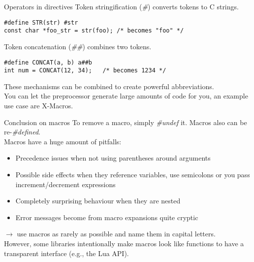 \begin{frame}[fragile = singleslide]{Operators in directives}
	Token stringification (\textit{\#}) converts tokens to C strings.
	\begin{lstlisting}[numbers=none]
#define STR(str) #str
const char *foo_str = str(foo);	/* becomes "foo" */
\end{lstlisting}
	\bigskip
	Token concatenation (\textit{\#\#}) combines two tokens.
\begin{lstlisting}[numbers=none]
#define CONCAT(a, b) a##b
int num = CONCAT(12, 34);	/* becomes 1234 */
\end{lstlisting}
	\bigskip
	These mechanisms can be combined to create powerful abbreviations.\\
	\bigskip
	You can let the preprocessor generate large amounts of code for you,
	an example use case are X-Macros.
\end{frame}

\begin{frame}[fragile = singleslide]{Conclusion on macros}
	To remove a macro, simply \textit{\#undef} it. Macros also can be re-\textit{\#defined}.\\
	\bigskip
	Macros have a huge amount of pitfalls:
	\begin{itemize}
		\item Precedence issues when not using parentheses around arguments
		\item Possible side effects when they reference variables, use semicolons
			  or you pass increment/decrement expressions
		\item Completely surprising behaviour when they are nested
		\item Error messages become from macro expansions quite cryptic
	\end{itemize}
	\bigskip
	$\rightarrow$ use macros as rarely as possible and name them in capital letters.\\
	\bigskip
	However, some libraries intentionally make macros look like functions to have a transparent
	interface (e.g., the Lua API).
\end{frame}


